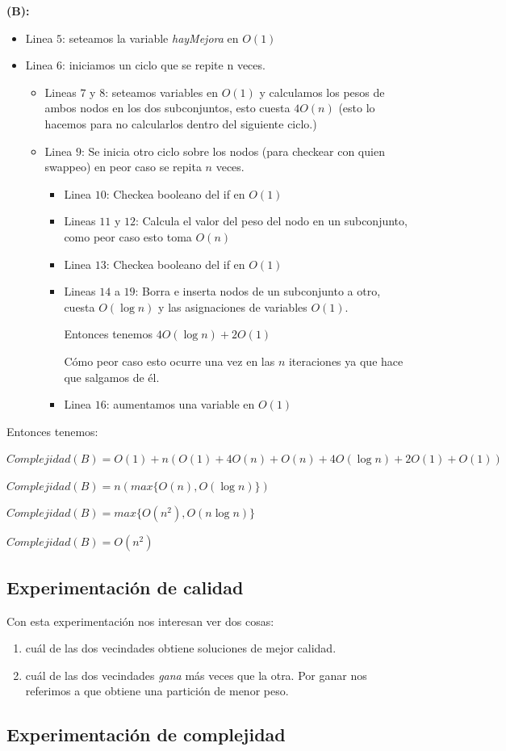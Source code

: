 \textbf{(B):}

\begin{itemize}
    \item Linea $5$: seteamos la variable \textit{hayMejora} en $O(1)$
    \item Linea $6$: iniciamos un ciclo que se repite n veces.
    \begin{itemize}
        \item Lineas $7$ y $8$: seteamos variables en $O(1)$ y calculamos los pesos de ambos nodos en los dos subconjuntos, esto cuesta $4O(n)$ (esto lo hacemos para no calcularlos dentro del siguiente ciclo.)
        \item Linea $9$: Se inicia otro ciclo sobre los nodos (para checkear con quien swappeo) en peor caso se repita $n$ veces.
        \begin{itemize}
            \item Linea $10$: Checkea booleano del if en $O(1)$
            \item Lineas $11$ y $12$: Calcula el valor del peso del nodo en un subconjunto, como peor caso esto toma $O(n)$
            \item Linea $13$: Checkea booleano del if en $O(1)$
            \item Lineas $14$ a $19$: Borra e inserta nodos de un subconjunto a otro, cuesta $O(\log n)$ y las asignaciones de variables $O(1)$. 

            Entonces tenemos $4O(\log n) + 2O(1)$

            Cómo peor caso esto ocurre una vez en las $n$ iteraciones ya que hace que salgamos de él.
            \item Linea $16$: aumentamos una variable en $O(1)$
        \end{itemize}
    \end{itemize}
\end{itemize}

Entonces tenemos:
\begin{center}
    $Complejidad(B) = O(1) + n(O(1)+4O(n)+O(n)+4O(\log n)+2O(1)+O(1))$

    $Complejidad(B) = n(max\{O(n),O(\log n)\})$

    $Complejidad(B) = max\{O(n^2),O(n\log n)\}$

    $Complejidad(B) = O(n^2)$
\end{center}

\subsection{Experimentación de calidad}
Con esta experimentación nos interesan ver dos cosas:
\begin{enumerate}
  \item cuál de las dos vecindades obtiene soluciones de mejor calidad.
  \item cuál de las dos vecindades \textit{gana} más veces que la otra. 
    Por ganar nos referimos a que obtiene una partición de menor peso.
\end{enumerate}


\subsection{Experimentación de complejidad}
